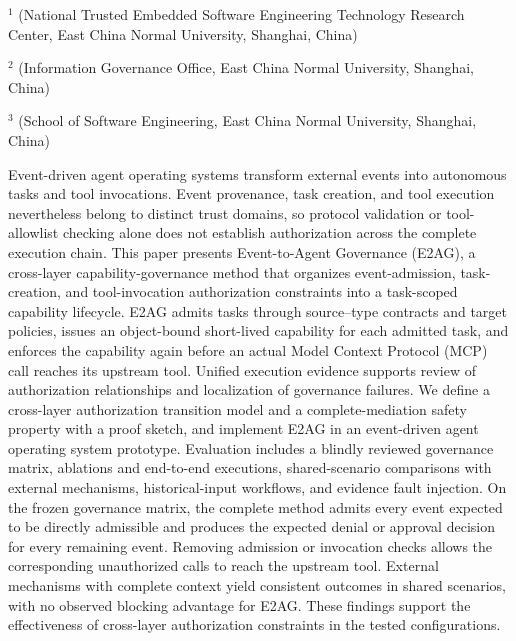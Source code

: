 \vspace{8pt}
\vspace{4pt}
\vspace{3pt}
\begingroup\fontsize{7.5pt}{10pt}\selectfont
\noindent$^{1}$ (National Trusted Embedded Software Engineering Technology Research Center, East China Normal University, Shanghai, China)\par
\noindent$^{2}$ (Information Governance Office, East China Normal University, Shanghai, China)\par
\noindent$^{3}$ (School of Software Engineering, East China Normal University, Shanghai, China)\par
\endgroup

\begin{josenabstract}
Event-driven agent operating systems transform external events into autonomous tasks and tool invocations. Event provenance, task creation, and tool execution nevertheless belong to distinct trust domains, so protocol validation or tool-allowlist checking alone does not establish authorization across the complete execution chain. This paper presents Event-to-Agent Governance (E2AG), a cross-layer capability-governance method that organizes event-admission, task-creation, and tool-invocation authorization constraints into a task-scoped capability lifecycle. E2AG admits tasks through source--type contracts and target policies, issues an object-bound short-lived capability for each admitted task, and enforces the capability again before an actual Model Context Protocol (MCP) call reaches its upstream tool. Unified execution evidence supports review of authorization relationships and localization of governance failures. We define a cross-layer authorization transition model and a complete-mediation safety property with a proof sketch, and implement E2AG in an event-driven agent operating system prototype. Evaluation includes a blindly reviewed governance matrix, ablations and end-to-end executions, shared-scenario comparisons with external mechanisms, historical-input workflows, and evidence fault injection. On the frozen governance matrix, the complete method admits every event expected to be directly admissible and produces the expected denial or approval decision for every remaining event. Removing admission or invocation checks allows the corresponding unauthorized calls to reach the upstream tool. External mechanisms with complete context yield consistent outcomes in shared scenarios, with no observed blocking advantage for E2AG. These findings support the effectiveness of cross-layer authorization constraints in the tested configurations.
\end{josenabstract}

\vspace{8pt}
